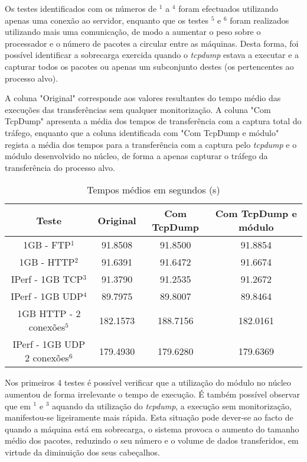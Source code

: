 Os testes identificados com os números de $^{1}$ a $^{4}$ foram efectuados utilizando apenas uma conexão ao servidor, enquanto que os testes $^{5}$ e $^{6}$ foram realizados utilizando mais uma comunicação, de modo a aumentar o peso sobre o processador e o número de pacotes a circular entre as máquinas. 
 Desta forma, foi possível identificar a sobrecarga exercida quando o \textit{tcpdump} estava a executar e a capturar todos os pacotes ou apenas um subconjunto destes (os pertencentes ao processo alvo).

 A coluna "Original" corresponde aos valores resultantes do tempo médio das execuções das transferências sem qualquer monitorização.
 A coluna "Com TcpDump" apresenta a média dos tempos de transferência com a captura total do tráfego, enquanto que a coluna identificada com "Com TcpDump e módulo" regista a média dos tempos para a transferência com a captura pelo \textit{tcpdump} e o módulo desenvolvido no núcleo, de forma a apenas capturar o tráfego da transferência do processo alvo.
\begin{table}
\begin{center}
\caption{Tempos médios em segundos (s)}
\begin{tabular}{ | c | c | c | c |  }
\hline
Teste & \hspace {0.3cm} Original \hspace {0.3cm}& \hspace {0.2cm} Com TcpDump \hspace {0.2cm} & Com TcpDump e módulo \\
\hline
1GB - FTP$^{1}$ & 91.8508	& 91.8500 & 91.8854 \\
1GB - HTTP$^{2}$ & 91.6391 & 91.6472 & 91.6674 \\ 
IPerf - 1GB TCP$^{3}$ & 91.3790	& 91.2535	& 91.2672 \\
IPerf - 1GB UDP$^{4}$ & 89.7975 & 89.8007 & 89.8464 \\
\hline
\hline
1GB HTTP - 2 conexões$^{5}$ & 182.1573 & 188.7156 & 182.0161 \\
IPerf - 1GB UDP 2 conexões$^{6}$ & 179.4930 & 179.6280 & 179.6369 \\
\hline
\end{tabular}
\label{tab:desempenho}
\end{center}
\end{table}

Nos primeiros 4 testes é possível verificar que a utilização do módulo no núcleo aumentou de forma irrelevante o tempo de execução.
 É também possível observar que em $^{1}$ e $^{3}$ aquando da utilização do \textit{tcpdump}, a execução sem monitorização, manifestou-se ligeiramente mais rápida.
 Esta situação pode dever-se ao facto de quando a máquina está em sobrecarga, o sistema provoca o aumento do tamanho médio dos pacotes, reduzindo o seu número e o volume de dados transferidos, em virtude da diminuição dos seus cabeçalhos.

